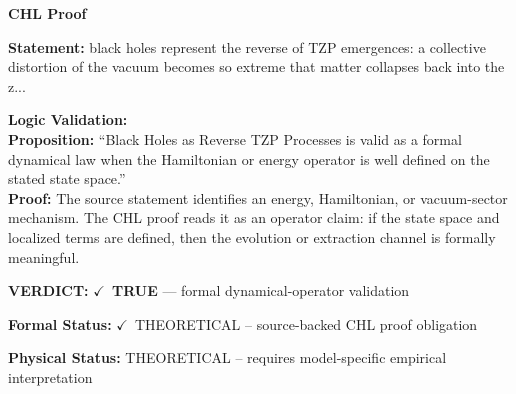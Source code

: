 \vspace{0.45em}
\noindent\textbf{CHL Proof}\par
\textbf{Statement:} black holes represent the reverse of TZP emergences: a collective distortion of the
vacuum becomes so extreme that matter collapses back into the z...

\textbf{Logic Validation:}\\
\textbf{Proposition:} ``Black Holes as Reverse TZP Processes is valid as a formal dynamical law when the
Hamiltonian or energy operator is well defined on the stated state space.''\\
\textbf{Proof:} The source statement identifies an energy, Hamiltonian, or vacuum-sector mechanism. The
CHL proof reads it as an operator claim: if the state space and localized terms are
defined, then the evolution or extraction channel is formally meaningful.

\textbf{VERDICT:} \ensuremath{\checkmark}\ \textbf{TRUE} --- formal dynamical-operator validation

\textbf{Formal Status:} \ensuremath{\checkmark}\ THEORETICAL -- source-backed CHL proof obligation

\textbf{Physical Status:} THEORETICAL -- requires model-specific empirical interpretation
\par\vspace{0.45em}
\par
\ifTZPDarkEdition
{}
\fi
\endgroup
\endgroup
